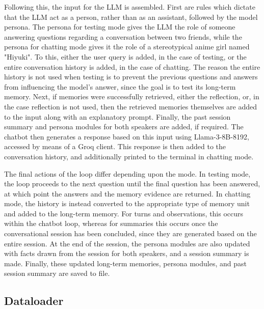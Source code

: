 Following this, the input for the LLM is assembled. First are rules which dictate that the LLM act as a person, rather than as an assistant, followed by the model persona. The persona for testing mode gives the LLM the role of someone answering questions regarding a conversation between two friends, while the persona for chatting mode gives it the role of a stereotypical anime girl named "Hiyuki". To this, either the user query is added, in the case of testing, or the entire conversation history is added, in the case of chatting. The reason the entire history is not used when testing is to prevent the previous questions and answers from influencing the model's answer, since the goal is to test its long-term memory. Next, if memories were successfully retrieved, either the reflection, or, in the case reflection is not used, then the retrieved memories themselves are added to the input along with an explanatory prompt. Finally, the past session summary and persona modules for both speakers are added, if required. The chatbot then generates a response based on this input using Llama-3-8B-8192, accessed by means of a Groq client. This response is then added to the conversation history, and additionally printed to the terminal in chatting mode. 

The final actions of the loop differ depending upon the mode. In testing mode, the loop proceeds to the next question until the final question has been answered, at which point the answers and the memory evidence are returned. In chatting mode, the history is instead converted to the appropriate type of memory unit and added to the long-term memory. For turns and observations, this occurs within the chatbot loop, whereas for summaries this occurs once the conversational session has been concluded, since they are generated based on the entire session. At the end of the session, the persona modules are also updated with facts drawn from the session for both speakers, and a session summary is made. Finally, these updated long-term memories, persona modules, and past session summary are saved to file.


\subsection{Dataloader}

